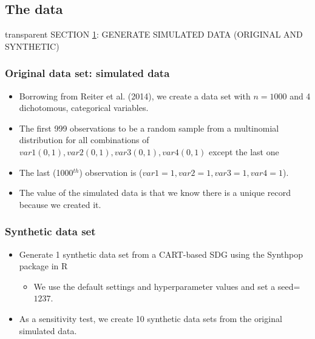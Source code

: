 \documentclass[t,8pt,utfx8]{beamer}
\begin{document}
\begin{spacing}{1.25}
\section{The data}\label{sec:data}

\begin{frame}[c,plain]
\vskip-4mm
\begin{beamercolorbox}[wd=\boxwidth,ht=22.11mm]{transparent}%
    \vfill%
    \leftinsert%
    \MakeUppercase{Section \ref{sec:data}: Generate simulated data (original and synthetic)
} %
\end{beamercolorbox}
\vskip-3mm
\end{frame}

\begin{frame}[t]\frametitle{Original data set: simulated data}
\begin{itemize}
    \item Borrowing from Reiter et al. (2014), we create a data set with $n=1000$ and 4 dichotomous, categorical variables. 
    \item The first 999 observations to be a random sample from a multinomial distribution for all combinations of $var1(0,1), var2(0,1), var3(0,1), var4(0,1)$ except the last one
    \item The last (1000$^{th}$) observation is ($var1=1,var2=1,var3=1,var4=1$). 
    \item The value of the simulated data is that we know there is a unique record because we created it.
\end{itemize}
\end{frame}

\begin{frame}[t]\frametitle{Synthetic data set}
\begin{itemize}
    \item Generate 1 synthetic data set from a CART-based SDG using the Synthpop package in R 
    \begin{itemize}
        \item We use the default settings and hyperparameter values and set a seed=$1237$. 
    \end{itemize}
    \item As a sensitivity test, we create 10 synthetic data sets from the original simulated data.  
\end{itemize}
\end{frame}


\end{spacing}
\end{document}

